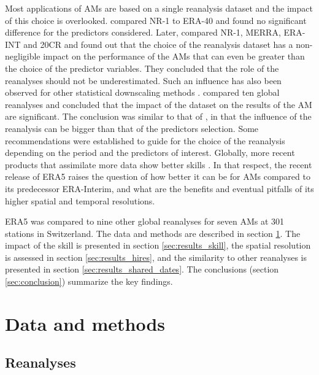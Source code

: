 \documentclass[alpha-refs]{wiley-article}
\begin{document}
Most applications of AMs are based on a single reanalysis dataset and the impact of this choice is overlooked. \citet{BenDaoud2009} compared NR-1 to ERA-40 and found no significant difference for the predictors considered. Later, \citet{Dayon2015} compared NR-1, MERRA, ERA-INT and 20CR and found out that the choice of the reanalysis dataset has a non-negligible impact on the performance of the AMs that can even be greater than the choice of the predictor variables. They concluded that the role of the reanalyses should not be underestimated. Such an influence has also been observed for other statistical downscaling methods \citep[e.g.][]{Koukidis2009}. \citet{Horton2018b} compared ten global reanalyses and concluded that the impact of the dataset on the results of the AM are significant. The conclusion was similar to that of \citet{Dayon2015}, in that the influence of the reanalysis can be bigger than that of the predictors selection. Some recommendations were established to guide for the choice of the reanalysis depending on the period and the predictors of interest. Globally, more recent products that assimilate more data show better skills \citep{Horton2018b}. In that respect, the recent release of ERA5 \citep{Hersbach2019} raises the question of how better it can be for AMs compared to its predecessor ERA-Interim, and what are the benefits and eventual pitfalls of its higher spatial and temporal resolutions.

ERA5 was compared to nine other global reanalyses for seven AMs at 301 stations in Switzerland. The data and methods are described in section \ref{sec:data_methods}. The impact of the skill is presented in section \ref{sec:results_skill}, the spatial resolution is assessed in section \ref{sec:results_hires}, and the similarity to other reanalyses is presented in section \ref{sec:results_shared_dates}. The conclusions (section \ref{sec:conclusion}) summarize the key findings.


\section{Data and methods}
\label{sec:data_methods}

\subsection{Reanalyses}
\label{sec:reanalyses}
\end{document}
